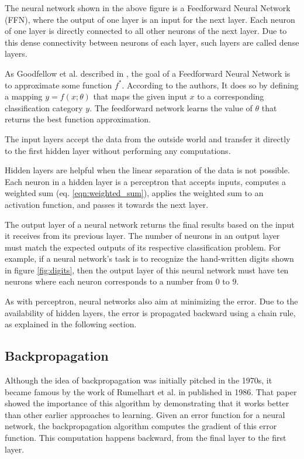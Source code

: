 The neural network shown in the above figure is a Feedforward Neural Network (FFN), where the output of one layer is an input for the next layer. Each neuron of one layer is directly connected to all other neurons of the next layer. Due to this dense connectivity between neurons of each layer, such layers are called dense layers.

As Goodfellow et al. described in \cite{goodfellow}, the goal of a Feedforward Neural Network is to approximate some function $f^*$. According to the authors, It does so by defining a mapping $y = f(x;\theta)$ that maps the given input $x$ to a corresponding classification category $y$. The feedforward network learns the value of $\theta$ that returns the best function approximation.

The input layers accept the data from the outside world and transfer it directly to the first hidden layer without performing any computations.

Hidden layers are helpful when the linear separation of the data is not possible. Each neuron in a hidden layer is a perceptron that accepts inputs, computes a weighted sum (eq. \ref{eqn:weighted_sum}), applies the weighted sum to an activation function, and passes it towards the next layer.

The output layer of a neural network returns the final results based on the input it receives from its previous layer. The number of neurons in an output layer must match the expected outputs of its respective classification problem.  For example, if a neural network's task is to recognize the hand-written digits shown in figure \ref{fig:digits}, then the output layer of this neural network must have ten neurons where each neuron corresponds to a number from $0$ to $9$.

As with perceptron, neural networks also aim at minimizing the error. Due to the availability of hidden layers, the error is propagated backward using a chain rule, as explained in the following section.

\subsection{Backpropagation}\label{subsection:backprop}

Although the idea of backpropagation was initially pitched in the 1970s, it became famous by the work of Rumelhart et al. in \cite{backprop86} published in 1986. That paper showed the importance of this algorithm by demonstrating that it works better than other earlier approaches to learning. Given an error function for a neural network, the backpropagation algorithm computes the gradient of this error function. This computation happens backward, from the final layer to the first layer.

